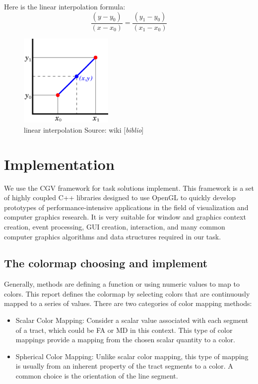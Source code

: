 \documentclass[a4paper, 12pt]{report}
\newcommand{\comment}[1]{{\color{red}[\textit{#1}]}}
\begin{document}
Here is the linear interpolation formula:
\begin{equation*}
 \frac{(y-y_0)}{(x-x_0)} = \frac{(y_1-y_0)}{(x_1-x_0)}
\end{equation*}

\begin{figure}[h]
	\centering
	\includegraphics[width=0.4\textwidth]{interp}
	\caption{ linear interpolation 
Source: wiki \comment{biblio}}
	\label{fig:interp}
\end{figure}

\chapter{Implementation}

We use the CGV framework for task solutions implement. This framework is a set of highly coupled C++ libraries designed to use OpenGL to quickly develop prototypes of performance-intensive applications in the field of visualization and computer graphics research. It is very suitable for window and graphics context creation, event processing, GUI creation, interaction, and many common computer graphics algorithms and data structures required in our task.

\section{The colormap choosing and implement}
Generally, methods are defining a function or using numeric values to map to colors. This report defines the colormap by selecting colors that are continuously mapped to a series of values. 
There are two categories of color mapping methods:
\begin{itemize}
	\item Scalar Color Mapping: Consider a scalar value associated with each segment of a tract, which could  be FA or MD in this context. This type of color mappings provide a mapping from the chosen scalar quantity to a color. 
	\item Spherical Color Mapping: Unlike scalar color mapping, this type of mapping is usually from an inherent property of the tract segments to a color. A common choice is the orientation of the line segment. 
\end{itemize}
\end{document}
